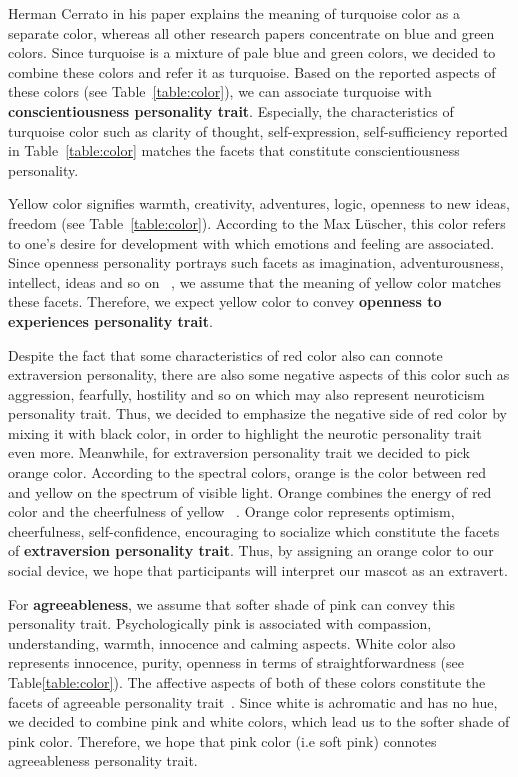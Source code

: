 Herman Cerrato in his paper explains the meaning of turquoise color as a separate color, whereas
all other research papers concentrate on blue and green colors.
Since turquoise is a mixture of pale blue and green colors, we decided to combine
these colors and refer it as turquoise.
Based on the reported aspects of these colors (see Table~\ref{table:color}),
we can associate turquoise with \textbf{conscientiousness personality trait}.
Especially, the characteristics of turquoise color such as clarity of thought,
self-expression, self-sufficiency reported in Table~\ref{table:color} matches the
facets that constitute conscientiousness personality.

Yellow color signifies warmth, creativity, adventures, logic, openness to new
ideas, freedom (see Table~\ref{table:color}).
According to the Max Lüscher, this color refers to one’s desire for development
with which emotions and feeling are associated.
Since openness personality portrays such facets as imagination, adventurousness, intellect, ideas
and so on ~\cite{costa1988catalog}, we assume that the meaning of yellow color matches these facets.
Therefore, we expect yellow color to convey \textbf{openness to experiences personality trait}.

Despite the fact that some characteristics of red color also can connote extraversion personality,
there are also some negative aspects of this color such as aggression, fearfully,
hostility and so on which may also represent neuroticism personality trait.
Thus, we decided to emphasize the negative side of red color by mixing it with black color,
in order to highlight the neurotic personality trait even more.
Meanwhile, for extraversion personality trait we decided to pick orange color.
According to the spectral colors, orange is the color between red and yellow on the spectrum of visible light.
Orange combines the energy of red color and the cheerfulness of yellow ~\cite{cerrato2012meaning}.
Orange color represents optimism, cheerfulness, self-confidence, encouraging
to socialize which constitute the facets of \textbf{extraversion personality trait}.
Thus, by assigning an orange color to our social device, we hope that
participants will interpret our mascot as an extravert.

For \textbf{agreeableness}, we assume that softer shade of pink can convey this personality trait.
Psychologically pink is associated with compassion, understanding, warmth, innocence and calming aspects.
White color also represents innocence, purity, openness in terms of straightforwardness (see Table\ref{table:color}).
The affective aspects of both of these colors constitute the facets of
agreeable personality trait~\cite{costa1988catalog}.
Since white is achromatic and has no hue, we decided to combine
pink and white colors, which lead us to the softer shade of pink color.
Therefore, we hope that pink color (i.e soft pink) connotes agreeableness personality trait.


